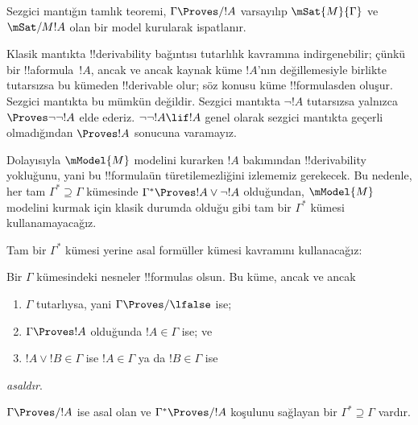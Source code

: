 \documentclass[../../../include/open-logic-section]{subfiles}
\begin{document}


Sezgici mantığın tamlık teoremi, $\Gamma\Proves/ !A$ varsayılıp
$\mSat{M}{\Gamma}$ ve $\mSat/{M}{!A}$ olan bir model kurularak ispatlanır.

Klasik mantıkta !!{derivability} bağıntısı tutarlılık kavramına
indirgenebilir; çünkü bir !!a{formula}~$!A$, ancak ve ancak kaynak küme
$!A$'nın değillemesiyle birlikte tutarsızsa bu kümeden !!{derivable} olur;
söz konusu küme !!{formula}s{}den oluşur. Sezgici mantıkta bu mümkün değildir.
Sezgici mantıkta
$\lnot !A$ tutarsızsa yalnızca $\Proves\lnot\lnot !A$ elde ederiz.
$\lnot\lnot !A\lif !A$ genel olarak sezgici mantıkta geçerli olmadığından
$\Proves !A$ sonucuna varamayız.

Dolayısıyla $\mModel{M}$ modelini kurarken $!A$ bakımından
!!{derivability} yokluğunu, yani bu !!{formula}{}ün türetilemezliğini
izlememiz gerekecek. Bu nedenle, her tam
$\Gamma^*\supseteq\Gamma$ kümesinde
$\Gamma^*\Proves !A\lor\lnot !A$ olduğundan, $\mModel{M}$ modelini kurmak
için klasik durumda olduğu gibi tam bir $\Gamma^*$ kümesi kullanamayacağız.

Tam bir $\Gamma^*$ kümesi yerine asal formüller kümesi kavramını
kullanacağız:

\begin{defn}
  Bir $\Gamma$ kümesindeki nesneler !!{formula}s olsun. Bu küme, ancak ve ancak
  \begin{enumerate}
  \item{} $\Gamma$ tutarlıysa, yani
    $\Gamma\Proves/\lfalse$ ise;
  \item{} $\Gamma\Proves !A$ olduğunda $!A\in\Gamma$ ise; ve
  \item{} $!A\lor !B\in\Gamma$ ise $!A\in\Gamma$ ya da
    $!B\in\Gamma$ ise
  \end{enumerate}
  \emph{asaldır}.
\end{defn}

\begin{lem}
   $\Gamma\Proves/ !A$ ise asal olan ve
  $\Gamma^*\Proves/ !A$ koşulunu sağlayan bir
  $\Gamma^*\supseteq\Gamma$ vardır.
\end{lem}
\end{document}
